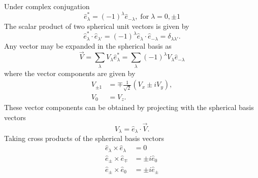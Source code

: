 \documentclass{book}[letterpaper,12pt]
\begin{document}
Under complex conjugation
\begin{equation}
\hat{e}_\lambda^*=(-1)^\lambda\hat{e}_{-\lambda},\;\mathrm{for}\;\lambda=0,\pm 1
\end{equation}
The scalar product of two spherical unit vectors is given by 
\begin{equation}
\hat{e}_\lambda^*\cdot\hat{e}_{\lambda'}=(-1)^\lambda\hat{e}_\lambda\cdot\hat{e}_{-\lambda}=\delta_{\lambda\lambda'}.
\end{equation}
Any vector may be expanded in the spherical basis as
\begin{equation}
\vec{V}=\sum_\lambda V_\lambda \hat{e}_\lambda^*=\sum_{\lambda}(-1)^\lambda V_\lambda \hat{e}_{-\lambda}
\end{equation}
where the vector components are given by
\begin{equation}
\begin{split}
V_{\pm 1}&=\mp \frac{1}{\sqrt{2}}\left(V_x\pm i V_y\right),\\
V_0&=V_z.
\end{split}
\end{equation}
These vector components can be obtained by projecting with the spherical basis vectors
\begin{equation}
V_\lambda=\hat{e}_\lambda\cdot\vec{V}.
\end{equation}
Taking cross products of the spherical basis vectors
\begin{equation}
\begin{split}
\hat{e}_{\lambda}\times\hat{e}_{\lambda}&=0\\
\hat{e}_{\pm}\times\hat{e}_{\mp}&=\pm i\hat{e}_0\\
\hat{e}_{\pm}\times\hat{e}_0&=\pm i\hat{e}_{\pm}
\end{split}
\end{equation}
\end{document}
